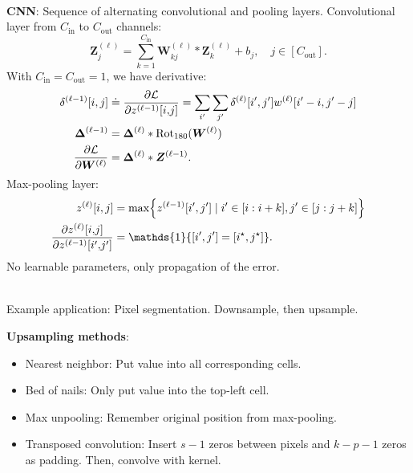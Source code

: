 \documentclass{article}
\newcommand{\lft}{\mathopen{}\mathclose\bgroup\left}
\newcommand{\rgt}{\aftergroup\egroup\right}
\newcommand{\mat}[1]{\bm{#1}}
\newenvironment{topic}[1]
{\textbf{\sffamily \colorbox{black}{\rlap{\textbf{\textcolor{white}{#1}}}\hspace{\linewidth}\hspace{-2\fboxsep}}} \\ \vspace{0.2cm}}
{}
\begin{document}
\begin{multicols*}{2}
\begin{topic}{Convolutional neural networks}
        \textbf{CNN}: Sequence of alternating convolutional and pooling layers. Convolutional layer from $C_{\mathrm{in}}$ to $C_{\mathrm{out}}$ channels: \[
            \mat{Z}_j^{(\ell)} = \sum_{k=1}^{C_{\mathrm{in}}} \mat{W}_{kj}^{(\ell)} * \mat{Z}_k^{(\ell)} + b_j, \quad j \in [C_{\mathrm{out}}].
        \]
        With $C_{\mathrm{in}} = C_{\mathrm{out}} = 1$, we have derivative:
        \begin{align*}
            \delta^{(\ell-1)}[i,j]              & \doteq \pdv{\mathcal{L}}{z^{(\ell-1)}[i{,}j]} = \sum_{i'} \sum_{j'} \delta^{(\ell)}[i',j'] w^{(\ell)}[i'-i,j'-j] \\
            \mat{\Delta}^{(\ell-1)}             & = \mat{\Delta}^{(\ell)} * \mathrm{Rot}_{180}(\mat{W}^{(\ell)})                                                   \\
            \pdv{\mathcal{L}}{\mat{W}^{(\ell)}} & = \mat{\Delta}^{(\ell)} * \mat{Z}^{(\ell - 1)}.
        \end{align*}
        Max-pooling layer:
        \begin{align*}
            z^{(\ell)}[i,j]                                & = \max \lft\{ z^{(\ell-1)}[i',j'] \mid i' \in [i : i + k], j' \in [j : j+k] \rgt\} \\
            \pdv{z^{(\ell)}[i{,}j]}{z^{(\ell-1)}[i'{,}j']} & = \mathds{1}\{ [i',j'] = [i^\star,j^\star] \}.
        \end{align*}
        No learnable parameters, only propagation of the error.

    \end{topic}

    \begin{topic}{Fully convolutional neural networks}
        Example application: Pixel segmentation. Downsample, then upsample.

        \textbf{Upsampling methods}:

        \begin{itemize}
            \item Nearest neighbor: Put value into all corresponding cells.
            \item Bed of nails: Only put value into the top-left cell.
            \item Max unpooling: Remember original position from max-pooling.
            \item Transposed convolution: Insert $s-1$ zeros between pixels and $k-p-1$ zeros as padding. Then,
                  convolve with kernel.
        \end{itemize}


\end{topic}
\end{multicols*}
\end{document}
